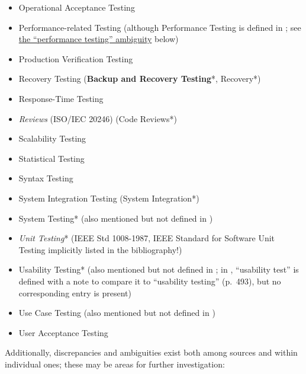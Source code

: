 \begin{itemize}
      \item Operational Acceptance Testing
      \item Performance-related Testing (although Performance Testing is
            defined in \citep{IEEE2022}; see \hyperref[perf-test-ambiguity]
            {the ``performance testing'' ambiguity} below)
      \item Production Verification Testing
      \item Recovery Testing (\textbf{Backup and Recovery Testing}*, Recovery*)
      \item Response-Time Testing
      \item \emph{Reviews} (ISO/IEC 20246) (Code Reviews*)
      \item Scalability Testing
      \item Statistical Testing
      \item Syntax Testing
      \item System Integration Testing (System Integration*)
      \item System Testing* (also mentioned but not defined in \citep{IEEE2013})
      \item \emph{Unit Testing}* (IEEE Std 1008-1987, IEEE Standard for
            Software Unit Testing implicitly listed in the bibliography!)
      \item Usability Testing* (also mentioned but not defined in \citep{IEEE2013};
            in \citep{IEEE2017}, ``usability test'' is defined with a note to
            compare it to ``usability testing'' (p.~493), but no corresponding
            entry is present)
      \item Use Case Testing (also mentioned but not defined in \citep{IEEE2013})
      \item User Acceptance Testing
\end{itemize}

Additionally, discrepancies and ambiguities exist both among sources and
within individual ones; these may be areas for further investigation:

